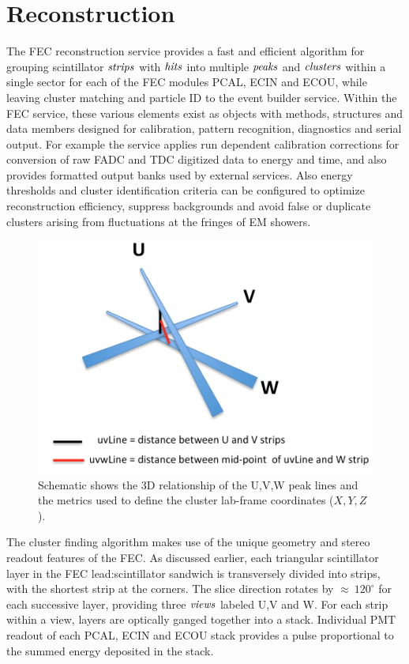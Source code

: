 \section{Reconstruction}

The FEC reconstruction service provides a fast and efficient algorithm for grouping scintillator $\it{strips}$ with $\it{hits}$ into multiple $\it{peaks}$ and $\it{clusters}$ within a single sector for each of the FEC modules PCAL, ECIN and ECOU, while leaving cluster matching and particle ID to the event builder service.  Within the FEC service, these various elements exist as objects with methods, structures and data members designed for calibration, pattern recognition, diagnostics and serial output.  For example the service applies run dependent calibration corrections for conversion of raw FADC and TDC digitized data to energy and time, and also provides formatted output banks used by external services.  Also energy thresholds and cluster identification criteria can be configured to optimize reconstruction efficiency, suppress backgrounds and avoid false or duplicate clusters arising from fluctuations at the fringes of EM showers. 

\begin{figure}[hbt]
\centering
\includegraphics[width=0.95\columnwidth,keepaspectratio]{img/S6_0.png}
\caption{Schematic shows the 3D relationship of the U,V,W peak lines and the metrics used to define the cluster lab-frame coordinates ($X,Y,Z$).}
\label{fig:S6_0}
\end{figure}

The cluster finding algorithm makes use of the unique geometry and stereo readout features of the FEC. As discussed earlier, each triangular scintillator layer in the FEC lead:scintillator sandwich is transversely divided into strips, with the shortest strip at the corners. The slice direction rotates by $\approx~120^{\circ}$ for each successive layer, providing three $\it{views}$ labeled U,V and W.  For each strip within a view, layers are optically ganged together into a stack.  Individual PMT readout of each PCAL, ECIN and ECOU stack provides a pulse proportional to the summed energy deposited in the stack.

